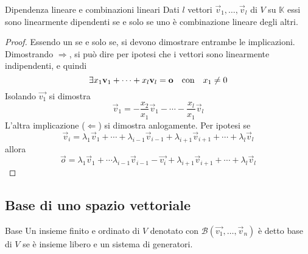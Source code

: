 \begin{Thm}{Dipendenza lineare e combinazioni lineari}
  Dati $l$ vettori $\vec{v}_1,\ldots,\vec{v}_l$ di $V$ su $\mathbb{K}$ essi sono
  linearmente dipendenti se e solo se uno è combinazione lineare degli altri.
\end{Thm}

\begin{proof}
  Essendo un se e solo se, si devono dimostrare entrambe le implicazioni. Dimostrando
  $\Rightarrow$, si può dire per ipotesi che i vettori sono linearmente indipendenti, e
  quindi
  \begin{equation*}
    \exists x_1\vec{v}_1+\cdots+x_l\vec{v}_l=\vec{o}\qq{con} x_1\neq0
  \end{equation*}
  Isolando $\vec{v_1}$ si dimostra
  \begin{equation*}
    \vec{v}_1= - \frac{x_2}{x_1}\vec{v}_1-\cdots-\frac{x_l}{x_1}\vec{v}_l
  \end{equation*}
  L'altra implicazione ($\Leftarrow$) si dimostra anlogamente. Per ipotesi se
  \begin{equation*}
    \vec{v}_i=\lambda_1\vec{v}_1+\cdots+\lambda_{i-1}\vec{v}_{i-1}+
    \lambda_{i+1}\vec{v}_{i+1}+\cdots+\lambda_l\vec{v}_l
  \end{equation*}
  allora
  \begin{equation*}
    \vec{o} =
    \lambda_1\vec{v}_1+\cdots\lambda_{i-1}\vec{v}_{i-1}-\vec{v_i}+\lambda_{i+1}\vec{v}_{i+1}
    +\cdots+\lambda_l\vec{v}_l
  \end{equation*}
\end{proof}

\subsection{Base di uno spazio vettoriale}%
\label{sub:base_di_uno_spazio_vettoriale}

\begin{Def}{Base}
  Un insieme finito e ordinato di $V$ denotato con
  $\mathscr{B}(\vec{v_1},\ldots,\vec{v}_n)$ è detto base di $V$ se è insieme libero e un
  sistema di generatori.
\end{Def}

